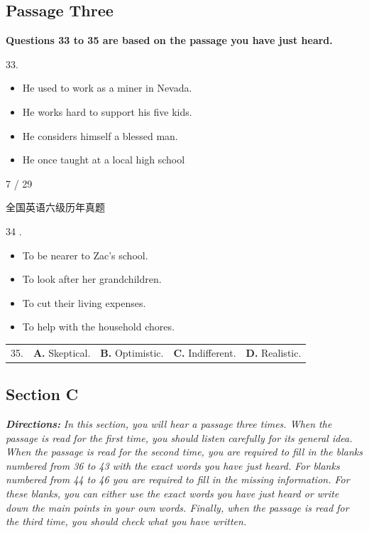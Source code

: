 \documentclass[UTF8,11pt]{ctexart}
\begin{document}
\subsection*{\textbf{Passage Three}}


\textbf{Questions 33 to 35 are based on the passage you have just heard.}


33.


\begin{itemize}[leftmargin=2em,itemsep=.2em,topsep=.4em]\item[A.] He used to work as a miner in Nevada.
\item[B.] He works hard to support his five kids.
\item[C.] He considers himself a blessed man.
\item[D.] He once taught at a local high school
\end{itemize}

7 / 29


全国英语六级历年真题


34 .


\begin{itemize}[leftmargin=2em,itemsep=.2em,topsep=.4em]\item[A.] To be nearer to Zac's school.
\item[B.] To look after her grandchildren.
\item[C.] To cut their living expenses.
\item[D.] To help with the household chores.
\end{itemize}

\noindent\begin{tabularx}{\linewidth}{@{}lXXXX@{}}35. & \textbf{A.} Skeptical. & \textbf{B.} Optimistic. & \textbf{C.} Indifferent. & \textbf{D.} Realistic.\\\end{tabularx}\par

\subsection*{\textbf{Section C}}


\textbf{\textit{Directions:}}\textit{ In this section, you will hear a passage three times. When the passage is read for the} \textit{first time, you should listen carefully for its general idea. When the passage is read for} \textit{the second time, you are required to fill in the blanks numbered from 36 to 43 with the} \textit{exact words you have just heard. For blanks numbered from 44 to 46 you are required} \textit{to fill in the missing information. For these blanks, you can either use the exact words} \textit{you have just heard or write down the main points in your own words. Finally, when} \textit{the passage is read for the third time, you should check what you have written.}
\end{document}
